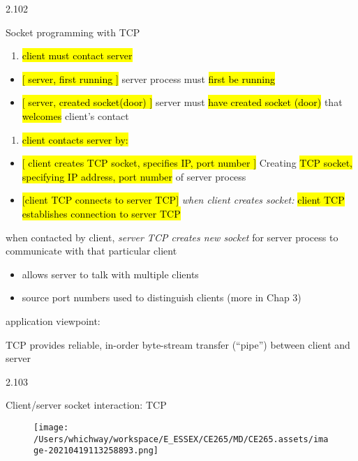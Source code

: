 \documentclass[
]{article}
\begin{document}
2.102

Socket programming with TCP

\begin{enumerate}
\def\labelenumi{\arabic{enumi}.}
\item
  \hl{client must contact server}
\end{enumerate}

\begin{itemize}
\item
  \hl{{[} server, first running {]}} server process must \hl{first be
  running}
\item
  \hl{{[} server, created socket(door) {]}} server must \hl{have created
  socket (door)} that \hl{welcomes} client's contact
\end{itemize}

\begin{enumerate}
\def\labelenumi{\arabic{enumi}.}
\item
  \hl{client contacts server by:}
\end{enumerate}

\begin{itemize}
\item
  \hl{{[} client creates TCP socket, specifies IP, port number {]}}
  Creating \hl{TCP socket, specifying IP address, port number} of server
  process
\item
  \hl{{[}client TCP connects to server TCP{]}} \emph{when client creates
  socket:} \hl{client TCP establishes connection to server TCP}
\end{itemize}

when contacted by client, \emph{server TCP creates new socket} for
server process to communicate with that particular client

\begin{itemize}
\item
  allows server to talk with multiple clients
\item
  source port numbers used to distinguish clients (more in Chap 3)
\end{itemize}

application viewpoint:

TCP provides reliable, in-order byte-stream transfer (``pipe'') between
client and server

2.103

Client/server socket interaction: TCP

\begin{figure}
\centering
\texttt{[image: /Users/whichway/workspace/E\_ESSEX/CE265/MD/CE265.assets/image-20210419113258893.png]}
\caption{}
\end{figure}
\end{document}
